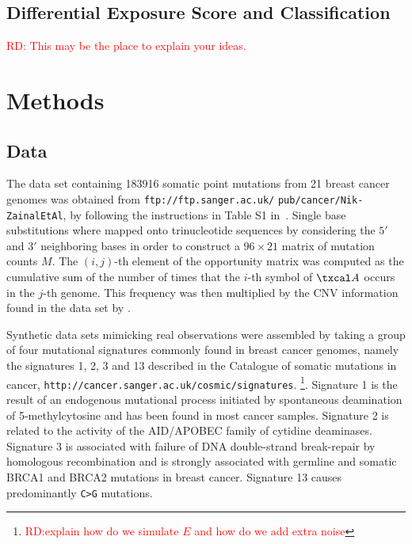 \documentclass{bioinfo}
\begin{document}
\subsection{Differential Exposure Score and Classification}
\textcolor{red}{RD: This may be the place to explain your 
ideas.} 


\section{Methods}
\subsection{Data} The data set containing 183916 somatic point
mutations from 21 breast cancer genomes was obtained from
\verb+ftp://ftp.sanger.ac.uk/+ \verb+pub/cancer/Nik-ZainalEtAl+, by
following the instructions in Table S1 in~\cite{NCell}. Single base 
substitutions where mapped onto trinucleotide sequences by considering
the $5'$ and $3'$ neighboring bases in order to construct a $96\times
21$ matrix of mutation counts $M$. 
The $(i,j)$-th element of the opportunity matrix was computed as the
cumulative sum of the number of times that the $i$-th symbol of
$\txcal A$ occurs in the $j$-th genome. This frequency was then
multiplied by the CNV information found in the data set by
\cite{NCell}.


Synthetic data sets mimicking real observations were assembled by
taking a group of four mutational signatures commonly found in 
breast cancer genomes, namely the signatures 1, 2, 3 and 13 described   
in the Catalogue  of somatic  mutations in cancer,
\verb~http://cancer.sanger.ac.uk/cosmic/signatures~.
\footnote{\textcolor{red}{RD:explain how do we simulate $E$ and how do
    we add extra noise}}. 
Signature 1 is the result of an endogenous mutational process
initiated by spontaneous deamination of 5-methylcytosine and has been
found in most cancer samples. Signature 2 is related to the activity
of the AID/APOBEC family of cytidine deaminases. Signature 3 is
associated with failure of DNA double-strand break-repair by
homologous recombination and is strongly associated with
germline and somatic BRCA1 and BRCA2 mutations in breast cancer.
Signature 13 causes predominantly \texttt{C>G} mutations.
\end{document}
